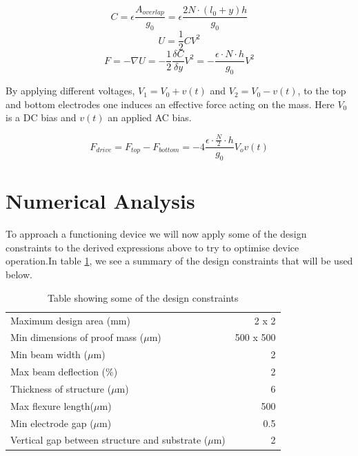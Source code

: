 \documentclass[12pt,a4paper,titlepage]{article}
\begin{document}
\begin{spacing}{1.1}
\begin{equation}
C = \epsilon \dfrac{A_{overlap}}{g_0} = \epsilon \dfrac{2N \cdot (l_0 +y) h  }{g_0}
\label{eq:combdrivecapacitance}
\end{equation}
\begin{equation}
U = \dfrac{1}{2} C V^2
\label{eq:capstoredenergy}
\end{equation}
\begin{equation}
F = -\nabla U = - \dfrac{1}{2} \dfrac{\delta C}{\delta y} V^2 = -\dfrac{\epsilon \cdot N  \cdot h}{g_0} V^2
\label{eq:capforce}
\end{equation}

By applying different voltages, $V_1 = V_0 + v(t)$ and $V_2 = V_0 - v(t)$, to the top and bottom electrodes one induces an effective force acting on the mass\supercite{Chang12}. Here $V_0$ is a DC bias and $v(t)$ an applied AC bias.

\begin{equation}
F_{drive} = F_{top} - F_{bottom} = -4\dfrac{\epsilon \cdot \frac{N}{2}  \cdot h}{g_0} V_o v(t)
\end{equation} 



\section{Numerical Analysis}
To approach a functioning device we will now apply some of the design constraints to the derived expressions above to try to optimise device operation.In table \ref{tab:designconstraints}, we see a summary of the design constraints that will be used below.

\begin{table}[htbp]
\caption{Table showing some of the design constraints}
\centering
\begin{tabular}{l|r}
\toprule
Maximum design area (mm) & {2 x 2} \\ 
Min dimensions of proof mass ($\mu$m) & {500 x 500} \\ 
Min beam width ($\mu$m) & 2 \\ 
Max beam deflection (\%) & 2 \\
Thickness of structure ($\mu$m) & 6 \\ 
Max flexure length($\mu$m) & 500 \\ 
Min electrode gap ($\mu$m) & 0.5 \\ 
Vertical gap between structure and substrate ($\mu$m) & 2 \\ \bottomrule
\end{tabular}
\label{tab:designconstraints}
\end{table}


\end{spacing}
\end{document}
